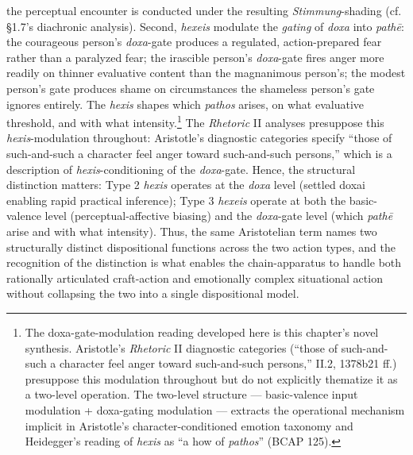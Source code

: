\documentclass{article}
\begin{document}
the perceptual encounter is conducted under the resulting \textit{Stimmung}-shading (cf. \S 1.7's diachronic analysis). Second, \textit{hexeis} modulate the \textit{gating} of \textit{doxa} into \textit{pathē}: the courageous person's \textit{doxa}-gate produces a regulated, action-prepared fear rather than a paralyzed fear; the irascible person's \textit{doxa}-gate fires anger more readily on thinner evaluative content than the magnanimous person's; the modest person's gate produces shame on circumstances the shameless person's gate ignores entirely. The \textit{hexis} shapes which \textit{pathos} arises, on what evaluative threshold, and with what intensity.\footnote{The doxa-gate-modulation reading developed here is this chapter's novel synthesis. Aristotle's \textit{Rhetoric} II diagnostic categories (``those of such-and-such a character feel anger toward such-and-such persons,'' II.2, 1378b21 ff.) presuppose this modulation throughout but do not explicitly thematize it as a two-level operation. The two-level structure --- basic-valence input modulation + doxa-gating modulation --- extracts the operational mechanism implicit in Aristotle's character-conditioned emotion taxonomy and Heidegger's reading of \textit{hexis} as ``a how of \textit{pathos}'' (BCAP 125).} The \textit{Rhetoric} II analyses presuppose this \textit{hexis}-modulation throughout: Aristotle's diagnostic categories specify ``those of such-and-such a character feel anger toward such-and-such persons,'' which is a description of \textit{hexis}-conditioning of the \textit{doxa}-gate. Hence, the structural distinction matters: Type 2 \textit{hexis} operates at the \textit{doxa} level (settled doxai enabling rapid practical inference); Type 3 \textit{hexeis} operate at both the basic-valence level (perceptual-affective biasing) and the \textit{doxa}-gate level (which \textit{pathē} arise and with what intensity). Thus, the same Aristotelian term names two structurally distinct dispositional functions across the two action types, and the recognition of the distinction is what enables the chain-apparatus to handle both rationally articulated craft-action and emotionally complex situational action without collapsing the two into a single dispositional model.
\end{document}
